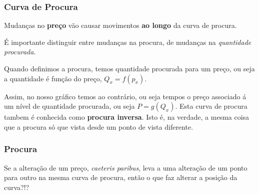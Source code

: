 \begin{frame}
	\frametitle{Curva de Procura}
	Mudan\c cas no \textbf{pre\c co} v\~ao causar movimentos \textbf{ao longo} da curva de procura.

	\vspace{0.4cm}

	\'E importante distinguir entre mudan\c cas na procura, de mudan\c cas na \emph{quantidade procurada}.

	\vspace{0.4cm}

	Quando definimos a procura, temos quantidade procurada para um pre\c co, ou seja a quantidade \'e fun\c c\~ao do pre\c co, $Q_x=f(p_x)$.

	\vspace{0.4cm}

	Assim, no nosso gr\'afico temos ao contr\'ario, ou seja tempos o pre\c co associado \'a um n\'ivel de quantidade procurada, ou seja $P=g(Q_x)$. Esta curva de procura tambem \'e conhecida como \textbf{procura inversa}. Isto \'e, na verdade, a mesma coisa que a procura s\'o que vista desde um ponto de vista diferente.

\end{frame}

\begin{frame}
	\frametitle{Procura}

	Se a altera\c c\~ao de um pre\c co, \emph{caeteris paribus}, leva a uma altera\c c\~ao de um ponto para outro na mesma curva de procura, ent\~ao o que faz alterar a posi\c c\~ao da curva?!?

\end{frame}

